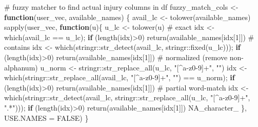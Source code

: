\documentclass[
  letterpaper,
  DIV=11,
  numbers=noendperiod]{scrartcl}
\newenvironment{Shaded}{\begin{snugshade}}{\end{snugshade}}
\newcommand{\AttributeTok}[1]{\textcolor[rgb]{0.40,0.45,0.13}{#1}}
\newcommand{\CommentTok}[1]{\textcolor[rgb]{0.37,0.37,0.37}{#1}}
\newcommand{\ConstantTok}[1]{\textcolor[rgb]{0.56,0.35,0.01}{#1}}
\newcommand{\ControlFlowTok}[1]{\textcolor[rgb]{0.00,0.23,0.31}{\textbf{#1}}}
\newcommand{\DecValTok}[1]{\textcolor[rgb]{0.68,0.00,0.00}{#1}}
\newcommand{\FunctionTok}[1]{\textcolor[rgb]{0.28,0.35,0.67}{#1}}
\newcommand{\NormalTok}[1]{\textcolor[rgb]{0.00,0.23,0.31}{#1}}
\newcommand{\OtherTok}[1]{\textcolor[rgb]{0.00,0.23,0.31}{#1}}
\newcommand{\SpecialCharTok}[1]{\textcolor[rgb]{0.37,0.37,0.37}{#1}}
\newcommand{\StringTok}[1]{\textcolor[rgb]{0.13,0.47,0.30}{#1}}
\begin{document}
\begin{Shaded}
\begin{Highlighting}[]
\CommentTok{\# fuzzy matcher to find actual injury columns in df}
\NormalTok{fuzzy\_match\_cols }\OtherTok{\textless{}{-}} \ControlFlowTok{function}\NormalTok{(user\_vec, available\_names) \{}
\NormalTok{  avail\_lc }\OtherTok{\textless{}{-}} \FunctionTok{tolower}\NormalTok{(available\_names)}
  \FunctionTok{sapply}\NormalTok{(user\_vec, }\ControlFlowTok{function}\NormalTok{(u)\{}
\NormalTok{    u\_lc }\OtherTok{\textless{}{-}} \FunctionTok{tolower}\NormalTok{(u)}
    \CommentTok{\# exact}
\NormalTok{    idx }\OtherTok{\textless{}{-}} \FunctionTok{which}\NormalTok{(avail\_lc }\SpecialCharTok{==}\NormalTok{ u\_lc); }\ControlFlowTok{if}\NormalTok{ (}\FunctionTok{length}\NormalTok{(idx)}\SpecialCharTok{\textgreater{}}\DecValTok{0}\NormalTok{) }\FunctionTok{return}\NormalTok{(available\_names[idx[}\DecValTok{1}\NormalTok{]])}
    \CommentTok{\# contains}
\NormalTok{    idx }\OtherTok{\textless{}{-}} \FunctionTok{which}\NormalTok{(stringr}\SpecialCharTok{::}\FunctionTok{str\_detect}\NormalTok{(avail\_lc, stringr}\SpecialCharTok{::}\FunctionTok{fixed}\NormalTok{(u\_lc))); }\ControlFlowTok{if}\NormalTok{ (}\FunctionTok{length}\NormalTok{(idx)}\SpecialCharTok{\textgreater{}}\DecValTok{0}\NormalTok{) }\FunctionTok{return}\NormalTok{(available\_names[idx[}\DecValTok{1}\NormalTok{]])}
    \CommentTok{\# normalized (remove non{-}alphanum)}
\NormalTok{    u\_norm }\OtherTok{\textless{}{-}}\NormalTok{ stringr}\SpecialCharTok{::}\FunctionTok{str\_replace\_all}\NormalTok{(u\_lc, }\StringTok{"[\^{}a{-}z0{-}9]+"}\NormalTok{, }\StringTok{""}\NormalTok{)}
\NormalTok{    idx }\OtherTok{\textless{}{-}} \FunctionTok{which}\NormalTok{(stringr}\SpecialCharTok{::}\FunctionTok{str\_replace\_all}\NormalTok{(avail\_lc, }\StringTok{"[\^{}a{-}z0{-}9]+"}\NormalTok{, }\StringTok{""}\NormalTok{) }\SpecialCharTok{==}\NormalTok{ u\_norm); }\ControlFlowTok{if}\NormalTok{ (}\FunctionTok{length}\NormalTok{(idx)}\SpecialCharTok{\textgreater{}}\DecValTok{0}\NormalTok{) }\FunctionTok{return}\NormalTok{(available\_names[idx[}\DecValTok{1}\NormalTok{]])}
    \CommentTok{\# partial word{-}match}
\NormalTok{    idx }\OtherTok{\textless{}{-}} \FunctionTok{which}\NormalTok{(stringr}\SpecialCharTok{::}\FunctionTok{str\_detect}\NormalTok{(avail\_lc, stringr}\SpecialCharTok{::}\FunctionTok{str\_replace\_all}\NormalTok{(u\_lc, }\StringTok{"[\^{}a{-}z0{-}9]+"}\NormalTok{, }\StringTok{".*"}\NormalTok{))); }\ControlFlowTok{if}\NormalTok{ (}\FunctionTok{length}\NormalTok{(idx)}\SpecialCharTok{\textgreater{}}\DecValTok{0}\NormalTok{) }\FunctionTok{return}\NormalTok{(available\_names[idx[}\DecValTok{1}\NormalTok{]])}
    \ConstantTok{NA\_character\_}
\NormalTok{  \}, }\AttributeTok{USE.NAMES =} \ConstantTok{FALSE}\NormalTok{)}
\NormalTok{\}}


\end{Highlighting}
\end{Shaded}
\end{document}
